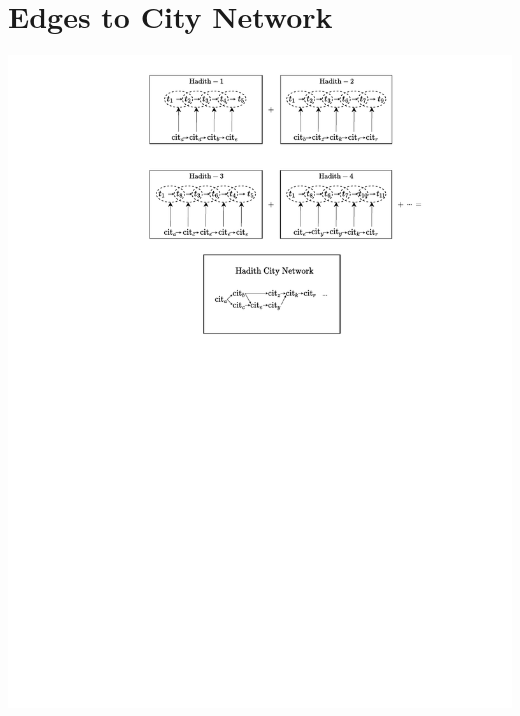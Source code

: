 \documentclass[12pt,english]{article}
\begin{document}
\section{Edges to City Network}
\vspace*{-0.4cm}
\hspace*{-2cm}
\includegraphics[scale=0.9]{edges-to-city-network/b2_edges_to_city_network.pdf}
\end{document}
